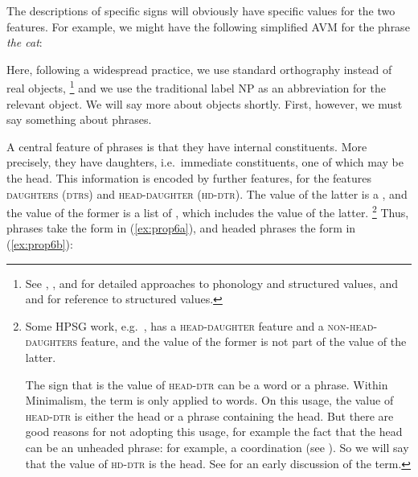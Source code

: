 \documentclass[output=paper
	        ,collection
	        ,collectionchapter
 	        ,biblatex
                ,babelshorthands
                ,newtxmath
                ,draftmode
                ,colorlinks, citecolor=brown
]{langscibook}
\begin{document}
\ea\label{ex:prop4}
\z

\noindent
The descriptions of specific signs will obviously have specific values for the two features. For example, we might have the following simplified AVM for the phrase \emph{the cat}:

\ea\label{ex:prop5}
\z

\noindent
Here, following a widespread practice, we use standard orthography instead of real 
objects,%
\footnote{See \citet{BK94b}, \citet{Hoehle99a-u}, and \citet{Walther99a-u} for detailed approaches to phonology
and structured \phon values, and  and \crossrefchaptert[\page \pageref{coord:page-rnr-I-phi-start}--\pageref{coord:page-rnr-I-phi-end}]{coordination} for reference to structured \phon values.
}
%
and we use the traditional label NP as an abbreviation for the relevant  object. We will say more about  objects shortly. First, however, we must say something about phrases.

A central feature of phrases is that they have internal constituents. More precisely, they have daughters, i.e.\ immediate constituents, one of which may be the head. This information is encoded by further features, for \citet[29]{GSag2000a-u} the features \textsc{daughters} (\textsc{dtrs}) and \textsc{head-daughter} (\textsc{hd-dtr}). The value of the latter is a , and the value of the former is a list of , which includes the value of the latter.%
%
\footnote{Some HPSG work, e.g.\ \citet{Sag97a}, has a \textsc{head-daughter} feature and a \textsc{non-head-daughters} feature, and the value of the former is not part of the value of the latter. 

The sign that is the value of \textsc{head-dtr} can be a word or a phrase. Within Minimalism, the term  is only applied to words. On this usage, the value of \textsc{head-dtr} is either the head or a phrase containing the head. But there are good reasons for not adopting this usage, for example the fact that the head can be an unheaded phrase: for example, a coordination (see ). So we will say that the value of \textsc{hd-dtr} is the head. See \citet[30]{Jackendoff77a} for an early discussion of the term.}
%
Thus, phrases take the form in (\ref{ex:prop6a}), and headed phrases the form in (\ref{ex:prop6b}):
\end{document}
